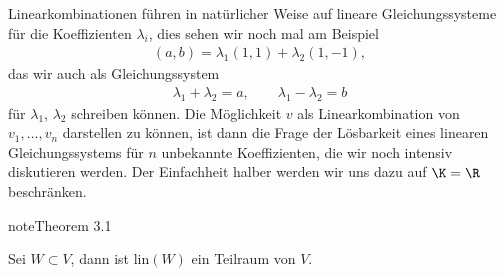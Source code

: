 \documentclass[letterpaper,10pt,english]{jupyterBook}
\begin{document}
Linearkombinationen führen in natürlicher Weise auf lineare Gleichungssysteme für die Koeffizienten \(\lambda_i\), dies sehen wir noch mal am Beispiel
\begin{equation*}
\begin{split} (a,b) = \lambda_1 (1,1) + \lambda_2 (1,-1),\end{split}
\end{equation*}
das wir auch  als Gleichungssystem
\begin{equation*}
\begin{split} \lambda_1 + \lambda_2 = a, \qquad \lambda_1 - \lambda_2 = b\end{split}
\end{equation*}
für \(\lambda_1\), \(\lambda_2\) schreiben können. Die Möglichkeit \(v\) als Linearkombination von \(v_1, \ldots,v_n\) darstellen zu können, ist dann die Frage der Lösbarkeit eines linearen Gleichungssystems für \(n\) unbekannte Koeffizienten, die wir noch intensiv diskutieren werden. Der Einfachheit halber werden wir uns dazu auf \(\K=\R\) beschränken.
\label{vektorraeume/vektorraeume:theorem-9}
\begin{sphinxadmonition}{note}{Theorem 3.1}



Sei \(W \subset V\), dann ist lin\((W)\) ein Teilraum von \(V\).
\end{sphinxadmonition}
\end{document}
